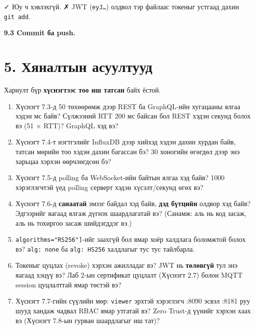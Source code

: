 ✓ Юу ч хэвлэхгүй. ✗ JWT (\texttt{eyJ\ldots{}}) олдвол тэр файлаас токеныг устгаад дахин \texttt{git\ add}.

\textbf{9.3 Commit ба push.}

\begin{Shaded}
\begin{Highlighting}[]
\KeywordTok{\&\&} 
\end{Highlighting}
\end{Shaded}

\hypertarget{ux445ux44fux43dux430ux43bux442ux44bux43d-ux430ux441ux443ux443ux43bux442ux443ux443ux434}{%
\section{5. Хяналтын асуултууд}\label{ux445ux44fux43dux430ux43bux442ux44bux43d-ux430ux441ux443ux443ux43bux442ux443ux443ux434}}

Хариулт бүр \textbf{хүснэгтээс тоо иш татсан} байх ёстой.

\begin{enumerate}
\def\labelenumi{\arabic{enumi}.}
\item
  Хүснэгт 7.3-д 50 төхөөрөмж дээр REST ба GraphQL-ийн хугацааны ялгаа хэдэн мс байв? Сүлжээний RTT 200 мс байсан бол REST хэдэн секунд болох вэ (51 × RTT)? GraphQL хэд вэ?
\item
  Хүснэгт 7.4-т нэгтгэлийг InfluxDB дээр хийхэд хэдэн дахин хурдан байв, татсан мөрийн тоо хэдэн дахин багассан бэ? 30 хоногийн өгөгдөл дээр энэ харьцаа хэрхэн өөрчлөгдсөн бэ?
\item
  Хүснэгт 7.5-д polling ба WebSocket-ийн байтын ялгаа хэд байв? 1000 хэрэглэгчтэй үед polling серверт хэдэн хүсэлт/секунд өгөх вэ?
\item
  Хүснэгт 7.6-д \textbf{санаатай} эмзэг байдал хэд байв, \textbf{дэд бүтцийн} олдвор хэд байв? Эдгээрийг яагаад ялгаж дүгнэх шаардлагатай вэ? (Санамж: аль нь код засаж, аль нь тохиргоо засаж шийдэгддэг вэ.)
\item
  \texttt{algorithms=\allowbreak{}{[}"RS256"{]}}-ийг заахгүй бол ямар хоёр халдлага боломжтой болох вэ? \texttt{alg:\ none} ба \texttt{alg:\ HS256} халдлагыг тус тус тайлбарла.
\item
  Токеныг цуцлах (revoke) хэрхэн ажилладаг вэ? JWT нь \textbf{төлөвгүй} тул энэ яагаад хэцүү вэ? Лаб 2-ын сертификат цуцлалт (Хүснэгт 2.7) болон MQTT session цуцлалттай ямар төстэй вэ?
\item
  Хүснэгт 7.7-гийн сүүлийн мөр: \texttt{viewer} эрхтэй хэрэглэгч :8090 эсвэл :8181 руу шууд хандаж чадвал RBAC ямар утгатай вэ? Zero Trust-д үүнийг хэрхэн хаах вэ (Хүснэгт 7.8-ын гурван шаардлагыг иш тат)?
\end{enumerate}

